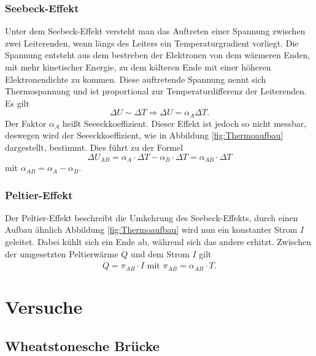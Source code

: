 \subsubsection{Seebeck-Effekt}
Unter dem Seebeck-Effekt versteht man das Auftreten einer Spannung zwischen zwei Leiterenden, wenn  längs des Leiters ein Temperaturgradient vorliegt. Die Spannung entsteht aus dem bestreben der Elektronen von dem wärmeren Enden, mit mehr kinetischer Energie, zu dem kälteren Ende mit einer höheren Elektronendichte zu kommen. Diese auftretende Spannung nennt sich Thermospannung und ist proportional zur Temperaturdifferenz der Leiterenden. Es gilt
\begin{equation}
\Delta U \sim \Delta T \Rightarrow \Delta U= \alpha_A\Delta T.
\end{equation} 
Der Faktor $\alpha_A$ heißt Seeeckkoeffizient. Dieser Effekt ist jedoch so nicht messbar, deswegen wird der Seeeckkoeffizient, wie in Abbildung \ref{fig:Thermoaufbau} dargestellt, bestimmt. Dies führt zu der Formel
\begin{equation}
\Delta U_{AB}=\alpha_A\cdot \Delta T -\alpha_B\cdot \Delta T = \alpha_{AB}\cdot \Delta T
\label{eq:Thermo}
\end{equation}
mit $\alpha_{AB}=\alpha_A-\alpha_B$.
\subsubsection{Peltier-Effekt}
Der Peltier-Effekt beschreibt die Umkehrung des Seebeck-Effekts, durch einen Aufbau ähnlich Abbildung \ref{fig:Thermoaufbau} wird nun ein konstanter Strom $I$ geleitet. Dabei kühlt sich ein Ende ab, während sich das andere erhitzt. Zwischen der umgesetzten Peltierwärme $\dot Q$ und dem Strom $I$ gilt
\begin{equation}
\dot Q = \pi_{AB}\cdot I \text{ mit } \pi_{AB}=\alpha_{AB}\cdot T.
\end{equation}
\section{Versuche}
\subsection{Wheatstonesche Brücke}

